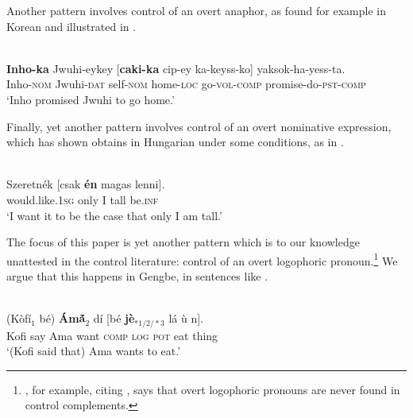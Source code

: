 \documentclass[output=paper,modfonts,nonflat]{langsci/langscibook}
\begin{document}
Another pattern involves control of an overt anaphor, as found for example in Korean and illustrated in .


\ea \label{ex:grano:4}
\\
\gll \textbf{Inho-ka} Jwuhi-eykey [\textbf{caki-ka} cip-ey ka-keyss-ko] yaksok-ha-yess-ta.\\
Inho-\textsc{nom} Jwuhi-\textsc{dat} self-\textsc{nom} home-\textsc{loc} go-\textsc{vol}-\textsc{comp} promise-do-\textsc{pst}-\textsc{comp}\\
\glt `Inho promised Jwuhi to go home.'\\
\z

Finally, yet another pattern involves control of an overt nominative expression, which \cite{Szabolcsi2009} has shown obtains in Hungarian under some conditions, as in .

\ea \label{ex:grano:5}
\\
\gll Szeretn\'ek [csak \textbf{\'en}  magas lenni].\\
would.like.1\textsc{sg} only I  tall be.\textsc{inf}\\
\glt `I want it to be the case that only I am tall.'\\
\z

The focus of this paper is yet another pattern which is to our knowledge unattested in the control literature: control of an overt logophoric pronoun.\footnote{\cite{Landau2015a}, for example, citing \cite{Culy1994}, says that overt logophoric pronouns are never found in control complements.}
 We argue that this happens in Gengbe, in sentences like .

\ea \label{ex:grano:wll:6}
\\
\gll (K\`of\'i$_{1}$ b\'e) \textbf{\'Am\'{\~a}$_{2}$}  d{\Z}\'i [b\'e \textbf{j\`e$_{*1/2/*3}$}  l\'a {\D}\`u n{\ú}].\\
Kofi say Ama want \textsc{comp} \textsc{log} \textsc{pot} eat thing\\
\glt `(Kofi said that) Ama wants to eat.'
\z

\end{document}
